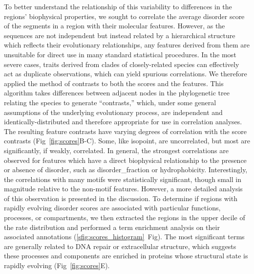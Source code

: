To better understand the relationship of this variability to differences in the regions' biophysical properties, we sought to correlate the average disorder score of the segments in a region with their molecular features. However, as the sequences are not independent but instead related by a hierarchical structure which reflects their evolutionary relationships, any features derived from them are unsuitable for direct use in many standard statistical procedures. In the most severe cases, traits derived from clades of closely-related species can effectively act as duplicate observations, which can yield spurious correlations. We therefore applied the method of contrasts to both the scores and the features. This algorithm takes differences between adjacent nodes in the phylogenetic tree relating the species to generate ``contrasts,'' which, under some general assumptions of the underlying evolutionary process, are independent and identically-distributed and therefore appropriate for use in correlation analyses. The resulting feature contrasts have varying degrees of correlation with the score contrasts (Fig~\ref{fig:scores}B-C). Some, like isopoint, are uncorrelated, but most are significantly, if weakly, correlated. In general, the strongest correlations are observed for features which have a direct biophysical relationship to the presence or absence of disorder, such as disorder\_fraction or hydrophobicity. Interestingly, the correlations with many motifs were statistically significant, though small in magnitude relative to the non-motif features. However, a more detailed analysis of this observation is presented in the discussion. To determine if regions with rapidly evolving disorder scores are associated with particular functions, processes, or compartments, we then extracted the regions in the upper decile of the rate distribution and performed a term enrichment analysis on their associated annotations (\ref{sfig:scores_histogram}~Fig). The most significant terms are generally related to DNA repair or extracellular structure, which suggests these processes and components are enriched in proteins whose structural state is rapidly evolving (Fig~\ref{fig:scores}E).

